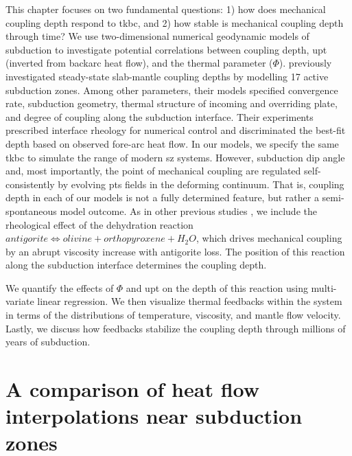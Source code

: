 This chapter focuses on two fundamental questions: 1) how does mechanical coupling depth respond to \gls{tkbc}, and 2) how stable is mechanical coupling depth through time? We use two-dimensional numerical geodynamic models of subduction to investigate potential correlations between coupling depth, \gls{upt} (inverted from backarc heat flow), and the thermal parameter (\(\Phi\)). \citet{Wada2009} previously investigated steady-state slab-mantle coupling depths by modelling 17 active subduction zones. Among other parameters, their models specified convergence rate, subduction geometry, thermal structure of incoming and overriding plate, and degree of coupling along the subduction interface. Their experiments prescribed interface rheology for numerical control and discriminated the best-fit depth based on observed fore-arc heat flow. In our models, we specify the same \gls{tkbc} to simulate the range of modern \gls{sz} systems. However, subduction dip angle and, most importantly, the point of mechanical coupling are regulated self-consistently by evolving \gls{pts} fields in the deforming continuum. That is, coupling depth in each of our models is not a fully determined feature, but rather a semi-spontaneous model outcome. As in other previous studies \citep[e.g.,][]{Ruh2015}, we include the rheological effect of the dehydration reaction \(antigorite \allowbreak \Leftrightarrow olivine + orthopyroxene + H_{2}O\), which drives mechanical coupling by an abrupt viscosity increase with antigorite loss. The position of this reaction along the subduction interface determines the coupling depth.

We quantify the effects of \(\Phi\) and \gls{upt} on the depth of this reaction using multi-variate linear regression. We then visualize thermal feedbacks within the system in terms of the distributions of temperature, viscosity, and mantle flow velocity. Lastly, we discuss how feedbacks stabilize the coupling depth through millions of years of subduction.

\cleardoublepage

\hypertarget{a-comparison-of-heat-flow-interpolations-near-subduction-zones}{%
\chapter{A comparison of heat flow interpolations near subduction zones}\label{a-comparison-of-heat-flow-interpolations-near-subduction-zones}}


